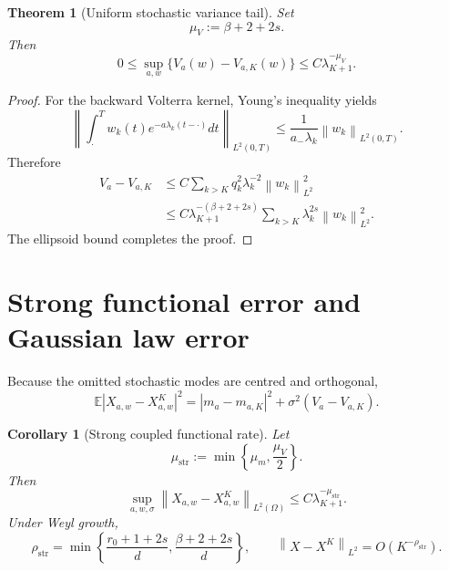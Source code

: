 \documentclass[11pt]{article}
\newtheorem{theorem}[assumption]{Theorem}
\newtheorem{corollary}[assumption]{Corollary}
\theoremstyle{remark}
\newcommand{\E}{\mathbb E}
\newcommand{\norm}[1]{\left\lVert #1\right\rVert}
\begin{document}
\begin{theorem}[Uniform stochastic variance tail]\label{thm:variance-tail}
Set
\begin{equation}\label{eq:muV}
 \mu_V:=\beta+2+2s.
\end{equation}
Then
\begin{equation}\label{eq:variance-tail}
 0\le
 \sup_{a,w}
 \{V_a(w)-V_{a,K}(w)\}
 \le C\lambda_{K+1}^{-\mu_V}.
\end{equation}
\end{theorem}

\begin{proof}
For the backward Volterra kernel, Young's inequality yields
\[
 \left\|
 \int_{\cdot}^T w_k(t)e^{-a\lambda_k(t-\cdot)}dt
 \right\|_{L^2(0,T)}
 \le\frac1{a_-\lambda_k}\norm{w_k}_{L^2(0,T)}.
\]
Therefore
\begin{align*}
 V_a-V_{a,K}
 &\le C\sum_{k>K}q_k^2\lambda_k^{-2}\norm{w_k}_{L^2}^2\\
 &\le C\lambda_{K+1}^{-(\beta+2+2s)}
 \sum_{k>K}\lambda_k^{2s}\norm{w_k}_{L^2}^2.
\end{align*}
The ellipsoid bound completes the proof.
\end{proof}

\section{Strong functional error and Gaussian law error}

Because the omitted stochastic modes are centred and orthogonal,
\begin{equation}\label{eq:strong-exact}
 \E|X_{a,w}-X_{a,w}^{K}|^2
 =|m_a-m_{a,K}|^2+\sigma^2(V_a-V_{a,K}).
\end{equation}

\begin{corollary}[Strong coupled functional rate]\label{cor:strong}
Let
\begin{equation}\label{eq:mustr}
 \mu_{\mathrm{str}}
 :=\min\left\{\mu_m,\frac{\mu_V}{2}\right\}.
\end{equation}
Then
\begin{equation}\label{eq:strong-rate}
 \sup_{a,w,\sigma}
 \norm{X_{a,w}-X_{a,w}^{K}}_{L^2(\Omega)}
 \le C\lambda_{K+1}^{-\mu_{\mathrm{str}}}.
\end{equation}
Under Weyl growth,
\begin{equation}\label{eq:rho-str}
 \rho_{\mathrm{str}}
 =\min\left\{
 \frac{r_0+1+2s}{d},
 \frac{\beta+2+2s}{d}
 \right\},
 \qquad
 \norm{X-X^K}_{L^2}=O(K^{-\rho_{\mathrm{str}}}).
\end{equation}
\end{corollary}
\end{document}
